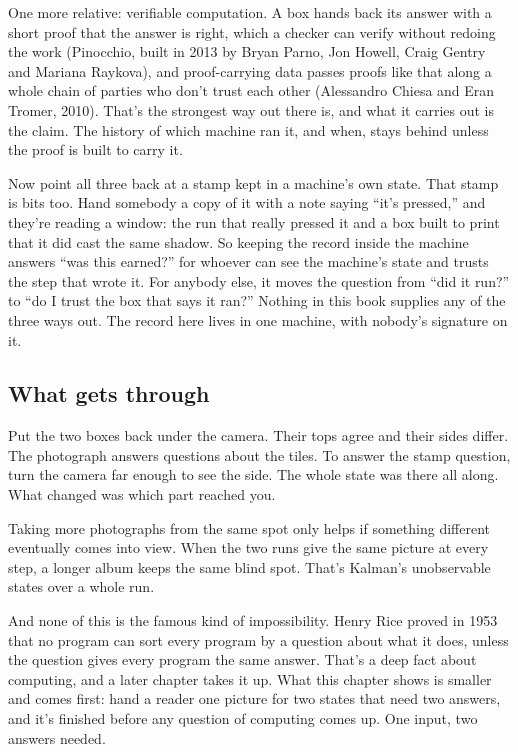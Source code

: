 \documentclass[11pt,twoside]{article}
\theoremstyle{thielethm}
\theoremstyle{thieledef}
\theoremstyle{thieledef}
\theoremstyle{thieledef}
\theoremstyle{thielethm}
\theoremstyle{thieleobs}
\theoremstyle{thielethm}
\begin{document}
One more relative: verifiable computation. A box hands back its answer with a short proof that the answer is right, which a checker can verify without redoing the work (Pinocchio, built in 2013 by Bryan Parno, Jon Howell, Craig Gentry and Mariana Raykova), and proof-carrying data passes proofs like that along a whole chain of parties who don't trust each other (Alessandro Chiesa and Eran Tromer, 2010). That's the strongest way out there is, and what it carries out is the claim. The history of which machine ran it, and when, stays behind unless the proof is built to carry it.

Now point all three back at a stamp kept in a machine's own state. That stamp is bits too. Hand somebody a copy of it with a note saying ``it's pressed,'' and they're reading a window: the run that really pressed it and a box built to print that it did cast the same shadow. So keeping the record inside the machine answers ``was this earned?'' for whoever can see the machine's state and trusts the step that wrote it. For anybody else, it moves the question from ``did it run?'' to ``do I trust the box that says it ran?'' Nothing in this book supplies any of the three ways out. The record here lives in one machine, with nobody's signature on it.

\subsection{What gets through}

Put the two boxes back under the camera. Their tops agree and their sides differ. The photograph answers questions about the tiles. To answer the stamp question, turn the camera far enough to see the side. The whole state was there all along. What changed was which part reached you.

Taking more photographs from the same spot only helps if something different eventually comes into view. When the two runs give the same picture at every step, a longer album keeps the same blind spot. That's Kalman's unobservable states over a whole run.

And none of this is the famous kind of impossibility. Henry Rice proved in 1953 that no program can sort every program by a question about what it does, unless the question gives every program the same answer. That's a deep fact about computing, and a later chapter takes it up. What this chapter shows is smaller and comes first: hand a reader one picture for two states that need two answers, and it's finished before any question of computing comes up. One input, two answers needed.
\end{document}
